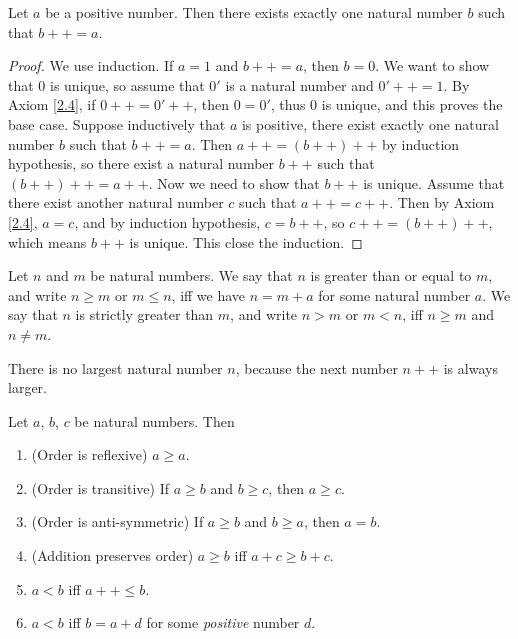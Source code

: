 \begin{lemma}\label{2.2.10}
    Let \(a\) be a positive number.
    Then there exists exactly one natural number \(b\) such that \(b++ = a\).
\end{lemma}

\begin{proof}
    We use induction.
    If \(a = 1\) and \(b++ = a\), then \(b = 0\).
    We want to show that \(0\) is unique, so assume that \(0'\) is a natural number and \(0'++ = 1\).
    By Axiom \ref{2.4}, if \(0++ = 0'++\), then \(0 = 0'\), thus \(0\) is unique, and this proves the base case.
    Suppose inductively that \(a\) is positive, there exist exactly one natural number \(b\) such that \(b++ = a\).
    Then \(a++ = (b++)++\) by induction hypothesis, so there exist a natural number \(b++\) such that \((b++)++ = a++\).
    Now we need to show that \(b++\) is unique.
    Assume that there exist another natural number \(c\) such that \(a++ = c++\).
    Then by Axiom \ref{2.4}, \(a = c\), and by induction hypothesis, \(c = b++\), so \(c++ = (b++)++\), which means \(b++\) is unique.
    This close the induction.
\end{proof}

\begin{definition}\label{2.2.11}
    Let \(n\) and \(m\) be natural numbers.
    We say that \(n\) is greater than or equal to \(m\), and write \(n \geq m\) or \(m \leq n\), iff we have \(n = m + a\) for some natural number \(a\).
    We say that \(n\) is strictly greater than \(m\), and write \(n > m\) or \(m < n\), iff \(n \geq m\) and \(n \neq m\).
\end{definition}

\begin{note}
    There is no largest natural number \(n\), because the next number \(n++\) is always larger.
\end{note}

\begin{proposition}\label{2.2.12}
    Let \(a\), \(b\), \(c\) be natural numbers.
    Then
    \begin{enumerate}
        \item (Order is reflexive) \(a \geq a\).
        \item (Order is transitive) If \(a \geq b\) and \(b \geq c\), then \(a \geq c\).
        \item (Order is anti-symmetric) If \(a \geq b\) and \(b \geq a\), then \(a = b\).
        \item (Addition preserves order) \(a \geq b\) iff \(a + c \geq b + c\).
        \item \(a < b\) iff \(a++ \leq b\).
        \item \(a < b\) iff \(b = a + d\) for some \emph{positive} number \(d\).
    \end{enumerate}
\end{proposition}

